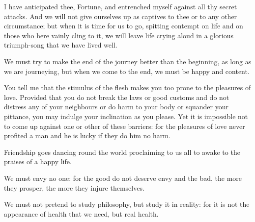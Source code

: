 \documentclass{stex}
\begin{document}
\vspace{0.5em}
\begin{sparagraph}[title=47]
  I have anticipated thee, Fortune, and entrenched myself against all thy secret attacks.
  And we will not give ourselves up as captives to thee or to any other circumstance; but when it is time for us to go, spitting contempt on life and on those who here vainly cling to it, we will leave life crying aloud in a glorious triumph-song that we have lived well.
\end{sparagraph}

\vspace{0.5em}
\begin{sparagraph}[title=48]
  We must try to make the end of the journey better than the beginning, as long as we are journeying, but when we come to the end, we must be happy and content.
\end{sparagraph}

\vspace{0.5em}
\begin{sparagraph}[title=51]
  You tell me that the stimulus of the flesh makes you too prone to the pleasures of love.
  Provided that you do not break the laws or good customs and do not distress any of your neighbours or do harm to your body or squander your pittance, you may indulge your inclination as you please.
  Yet it is impossible not to come up against one or other of these barriers: for the pleasures of love never profited a man and he is lucky if they do him no harm.
\end{sparagraph}

\vspace{0.5em}
\begin{sparagraph}[title=52]
  Friendship goes dancing round the world proclaiming to us all to awake to the praises of a happy life.
\end{sparagraph}

\vspace{0.5em}
\begin{sparagraph}[title=53]
  We must envy no one: for the good do not deserve envy and the bad, the more they prosper, the more they injure themselves.
\end{sparagraph}

\vspace{0.5em}
\begin{sparagraph}[title=54]
  We must not pretend to study philosophy, but study it in reality: for it is not the appearance of health that we need, but real health.
\end{sparagraph}
\end{document}
